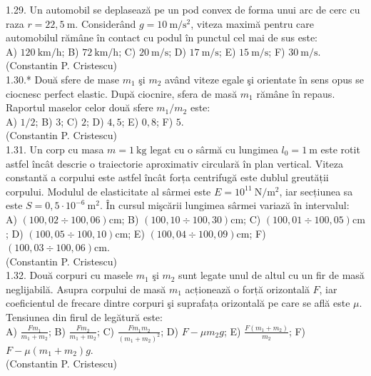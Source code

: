 1.29. Un automobil se deplasează pe un pod convex de forma unui arc de cerc cu raza $r=22,5 \mathrm{~m}$. Considerând $g=10 \mathrm{~m} / \mathrm{s}^{2}$, viteza maximă pentru care automobilul rămâne în contact cu podul în punctul cel mai de sus este:\\ A) $120 \mathrm{~km} / \mathrm{h}$; B) $72 \mathrm{~km} / \mathrm{h}$; C) $20 \mathrm{~m} / \mathrm{s}$; D) $17 \mathrm{~m} / \mathrm{s}$; E) $15 \mathrm{~m} / \mathrm{s}$; F) $30 \mathrm{~m} / \mathrm{s}$.\\ (Constantin P. Cristescu)\\

1.30.* Două sfere de mase $m_{1}$ şi $m_{2}$ având viteze egale şi orientate în sens opus se ciocnesc perfect elastic. După ciocnire, sfera de masă $m_{1}$ rămâne în repaus. Raportul maselor celor două sfere $m_{1} / m_{2}$ este:\\ A) $1 / 2$; B) $3$; C) $2$; D) $4,5$; E) $0,8$; F) $5$.\\ (Constantin P. Cristescu)\\

1.31. Un corp cu masa $m=1 \mathrm{~kg}$ legat cu o sârmă cu lungimea $l_{0}=1 \mathrm{~m}$ este rotit astfel încât descrie o traiectorie aproximativ circulară în plan vertical. Viteza constantă a corpului este astfel încât forța centrifugă este dublul greutății corpului. Modulul de elasticitate al sârmei este $E=10^{11} \mathrm{~N} / \mathrm{m}^{2}$, iar secțiunea sa este $S=0,5 \cdot 10^{-6} \mathrm{~m}^{2}$. În cursul mişcării lungimea sârmei variază în intervalul:\\ A) $(100,02 \div 100,06) \mathrm{cm}$; B) $(100,10 \div 100,30) \mathrm{cm}$; C) $(100,01 \div 100,05) \mathrm{cm}$; D) $(100,05 \div 100,10) \mathrm{cm}$; E) $(100,04 \div 100,09) \mathrm{cm}$; F) $(100,03 \div 100,06) \mathrm{cm}$.\\ (Constantin P. Cristescu)\\

1.32. Două corpuri cu masele $m_{1}$ şi $m_{2}$ sunt legate unul de altul cu un fir de masă neglijabilă. Asupra corpului de masă $m_{1}$ acționează o forță orizontală $F$, iar coeficientul de frecare dintre corpuri şi suprafața orizontală pe care se află este $\mu$. Tensiunea din firul de legătură este:\\ A) $\frac{F m_{1}}{m_{1}+m_{2}}$; B) $\frac{F m_{2}}{m_{1}+m_{2}}$; C) $\frac{F m_{1} m_{2}}{\left(m_{1}+m_{2}\right)^{2}}$; D) $F-\mu m_{2} g$; E) $\frac{F\left(m_{1}+m_{2}\right)}{m_{2}}$; F) $F-\mu\left(m_{1}+m_{2}\right) g$.\\ (Constantin P. Cristescu)\\

